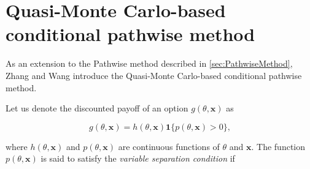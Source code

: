 



\section{Quasi-Monte Carlo-based conditional pathwise method} \label{sec:qmc-cpwmethod}
As an extension to the Pathwise method described in \ref{sec:PathwiseMethod}, Zhang and Wang \cite{ZhangConditionalQuasiMonteCarloMethod} introduce the Quasi-Monte Carlo-based conditional pathwise method.

Let us denote the discounted payoff of an option $g(\theta,\boldsymbol{x})$ as

\begin{equation} \label{eqn:QmcCpwDiscountedPayoff}
    g(\theta,\boldsymbol{x}) = h(\theta,\boldsymbol{x})\boldsymbol{1}\{p(\theta,\boldsymbol{x}) > 0\},
\end{equation}

where $h(\theta,\boldsymbol{x})$ and $p(\theta,\boldsymbol{x})$ are continuous functions of $\theta$ and $\boldsymbol{x}$. The function $p(\theta,\boldsymbol{x})$ is said to satisfy the \textit{variable separation condition} if


